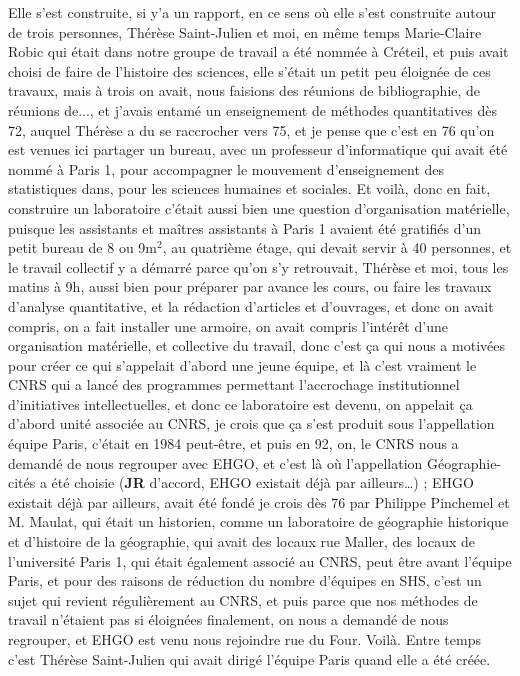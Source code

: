 \documentclass[12pt]{article}
\begin{document}
Elle s'est construite, si y'a un rapport, en ce sens où elle s'est construite autour de trois personnes, Thérèse Saint-Julien et moi, en même temps Marie-Claire Robic qui était dans notre groupe de travail a été nommée à Créteil, et puis avait choisi de faire de l'histoire des sciences, elle s'était un petit peu éloignée de ces travaux, mais à trois on avait, nous faisions des réunions de bibliographie, de réunions de..., et j'avais entamé un enseignement de méthodes quantitatives dès 72, auquel Thérèse a du se raccrocher vers 75, et je pense que c'est en 76 qu'on est venues ici partager un bureau, avec un professeur d'informatique qui avait été nommé à Paris 1, pour accompagner le mouvement d'enseignement des statistiques dans, pour les sciences humaines et sociales. Et voilà, donc en fait, construire un laboratoire c'était aussi bien une question d'organisation matérielle, puisque les assistants et maîtres assistants à Paris 1 avaient été gratifiés d'un petit bureau de 8 ou 9m$^2$, au quatrième étage, qui devait servir à 40 personnes, et le travail collectif y a démarré parce qu'on s'y retrouvait, Thérèse et moi, tous les matins à 9h, aussi bien pour préparer par avance les cours, ou faire les travaux d'analyse quantitative, et la rédaction d'articles et d'ouvrages, et donc on avait compris, on a fait installer une armoire, on avait compris l'intérêt d'une organisation matérielle, et collective du travail, donc c'est ça qui nous a motivées pour créer ce qui s'appelait d'abord une jeune équipe, et là c'est vraiment le CNRS qui a lancé des programmes permettant l'accrochage institutionnel d'initiatives intellectuelles, et donc ce laboratoire est devenu, on appelait ça d'abord unité associée au CNRS, je crois que ça s'est produit sous l'appellation équipe Paris, c'était en 1984 peut-être, et puis en 92, on, le CNRS nous a demandé de nous regrouper avec EHGO, et c'est là où l'appellation Géographie-cités a été choisie (\textbf{JR} d'accord, EHGO existait déjà par ailleurs\ldots ) ; EHGO existait déjà par ailleurs, avait été fondé je crois dès 76 par Philippe Pinchemel et M. Maulat, qui était un historien, comme un laboratoire de géographie historique et d'histoire de la géographie, qui avait des locaux rue Maller, des locaux de l'université Paris 1, qui était également associé au CNRS, peut être avant l'équipe Paris, et pour des raisons de réduction du nombre d'équipes en SHS, c'est un sujet qui revient régulièrement au CNRS, et puis parce que nos méthodes de travail n'étaient pas si éloignées finalement, on nous a demandé de nous regrouper, et EHGO est venu nous rejoindre rue du Four. Voilà. Entre temps c'est Thérèse Saint-Julien qui avait dirigé l'équipe Paris quand elle a été créée.
\end{document}
